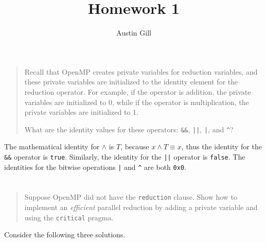 \documentclass{article}
\title{Homework 1}
\author{Austin Gill}
\begin{document}
\maketitle

\section{}
    \begin{quote}
        Recall that OpenMP creates private variables for reduction variables, and these private variables are initialized to the identity element for the reduction operator. For example, if the operator is addition, the private variables are initialized to 0, while if the operator is multiplication, the private variables are initialized to 1.

        What are the identity values for these operators: \texttt{&&}, \texttt{||}, \texttt{|}, and \texttt{^}?
    \end{quote}

    The mathematical identity for $\land$ is $T$, because $x \land T \equiv x$, thus the identity for the \texttt{&&} operator is \texttt{true}. Similarly, the identity for the \texttt{||} operator is \texttt{false}. The identities for the bitwise operations \texttt{|} and \texttt{^} are both \texttt{0x0}.

\section{}
    \begin{quote}
        Suppose OpenMP did not have the \texttt{reduction} clause. Show how to implement an \textit{efficient} parallel reduction by adding a private variable and using the \texttt{critical} pragma.
    \end{quote}

    Consider the following three solutions.
\end{document}
